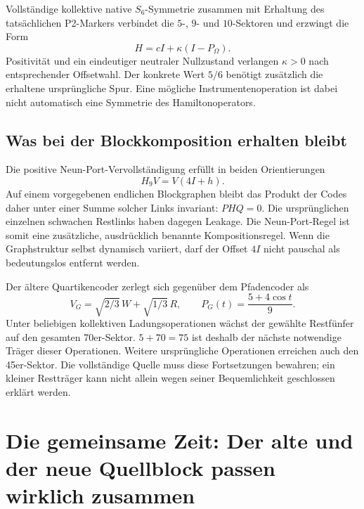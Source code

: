 Vollständige kollektive native $S_6$-Symmetrie zusammen mit Erhaltung des tatsächlichen P2-Markers verbindet die $5$-, $9$- und $10$-Sektoren und erzwingt die Form
\begin{equation}
H=cI+\kappa(I-P_\Omega).
\end{equation}
Positivität und ein eindeutiger neutraler Nullzustand verlangen $\kappa>0$ nach entsprechender Offsetwahl. Der konkrete Wert $5/6$ benötigt zusätzlich die erhaltene ursprüngliche Spur. Eine mögliche Instrumentenoperation ist dabei nicht automatisch eine Symmetrie des Hamiltonoperators.

\subsection{Was bei der Blockkomposition erhalten bleibt}
Die positive Neun-Port-Vervollständigung erfüllt in beiden Orientierungen
\begin{equation}
H_9V=V(4I+h).
\end{equation}
Auf einem vorgegebenen endlichen Blockgraphen bleibt das Produkt der Codes daher unter einer Summe solcher Links invariant: $PHQ=0$. Die ursprünglichen einzelnen schwachen Restlinks haben dagegen Leakage. Die Neun-Port-Regel ist somit eine zusätzliche, ausdrücklich benannte Kompositionsregel. Wenn die Graphstruktur selbst dynamisch variiert, darf der Offset $4I$ nicht pauschal als bedeutungslos entfernt werden.

Der ältere Quartikencoder zerlegt sich gegenüber dem Pfadencoder als
\begin{equation}
V_G=\sqrt{2/3}\,W+\sqrt{1/3}\,R,
\qquad P_G(t)=\frac{5+4\cos t}{9}.
\end{equation}
Unter beliebigen kollektiven Ladungsoperationen wächst der gewählte Restfünfer auf den gesamten 70er-Sektor. $5+70=75$ ist deshalb der nächste notwendige Träger dieser Operationen. Weitere ursprüngliche Operationen erreichen auch den 45er-Sektor. Die vollständige Quelle muss diese Fortsetzungen bewahren; ein kleiner Restträger kann nicht allein wegen seiner Bequemlichkeit geschlossen erklärt werden.

\section{Die gemeinsame Zeit: Der alte und der neue Quellblock passen wirklich zusammen}

